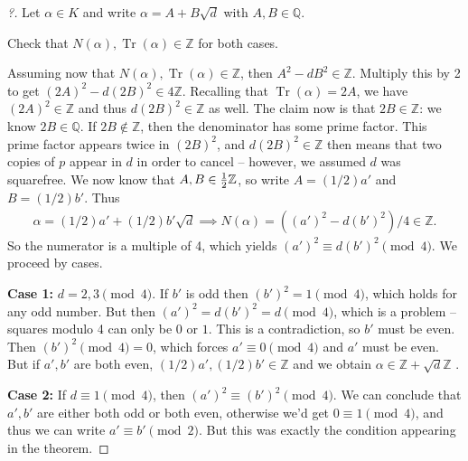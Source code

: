 \begin{proof}[?]

Let \(\alpha\in K\) and write \(\alpha = A + B \sqrt{d}\) with
\(A, B\in {\mathbb{Q}}\).

\begin{exercise}[?]

Check that \(N( \alpha), \operatorname{Tr}( \alpha) \in {\mathbb{Z}}\)
for both cases.

\end{exercise}

Assuming now that
\(N( \alpha), \operatorname{Tr}( \alpha) \in {\mathbb{Z}}\), then
\(A^2 - dB^2 \in {\mathbb{Z}}\). Multiply this by 2 to get
\((2A)^2 - d(2B)^2 \in 4{\mathbb{Z}}\). Recalling that
\(\operatorname{Tr}( \alpha) = 2 A\), we have
\((2A)^2 \in {\mathbb{Z}}\) and thus \(d(2B)^2 \in {\mathbb{Z}}\) as
well. The claim now is that \(2B \in {\mathbb{Z}}\): we know
\(2B\in {\mathbb{Q}}\). If \(2B\not\in {\mathbb{Z}}\), then the
denominator has some prime factor. This prime factor appears twice in
\((2B)^2\), and \(d(2B)^2 \in {\mathbb{Z}}\) then means that two copies
of \(p\) appear in \(d\) in order to cancel -- however, we assumed \(d\)
was squarefree. We now know that \(A, B \in {1\over 2}{\mathbb{Z}}\), so
write \(A = (1/2)a'\) and \(B = (1/2)b'\). Thus
\begin{align*} 
\alpha= (1/2)a' + (1/2)b' \sqrt{d} 
\implies
N( \alpha) = ((a')^2 - d(b')^2) / 4 \in {\mathbb{Z}}
.\end{align*}
So the numerator is a multiple of 4, which yields
\((a')^2 \equiv d(b')^2 \pmod 4\). We proceed by cases.

\hfill\break

\textbf{Case 1:} \(d = 2,3 \pmod 4\). If \(b'\) is odd then
\((b')^2 = 1\pmod 4\), which holds for any odd number. But then
\((a')^2 = d(b')^2 = d \pmod 4\), which is a problem -- squares modulo 4
can only be \(0\) or \(1\). This is a contradiction, so \(b'\) must be
even. Then \((b')^2 \pmod 4 = 0\), which forces \(a' \equiv 0 \pmod 4\)
and \(a'\) must be even. But if \(a', b'\) are both even,
\((1/2)a', (1/2)b'\in {\mathbb{Z}}\) and we obtain
\(\alpha\in {\mathbb{Z}}+ \sqrt{d} {\mathbb{Z}}\) .

\hfill\break

\textbf{Case 2:} If \(d\equiv 1 \pmod 4\), then
\((a')^2 \equiv (b')^2 \pmod 4\). We can conclude that \(a', b'\) are
either both odd or both even, otherwise we'd get \(0\equiv 1 \pmod 4\),
and thus we can write \(a' \equiv b' \pmod 2\). But this was exactly the
condition appearing in the theorem.

\end{proof}

